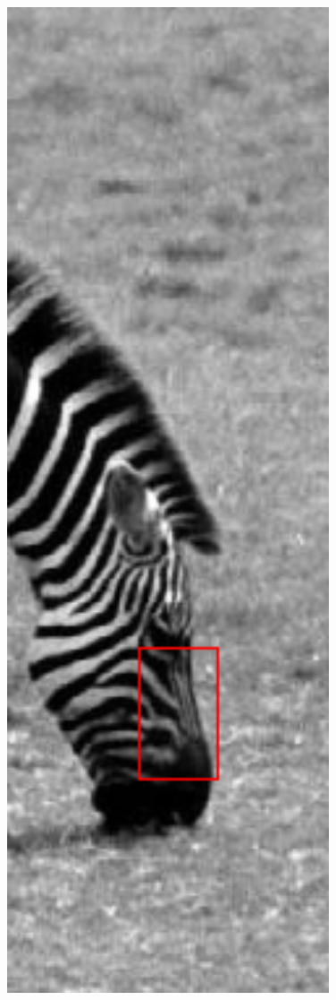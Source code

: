 \documentclass[review,numbers,sort&compress]{elsarticle}  %
\begin{document}
\begin{figure}[t]
{\begin{minipage}[b]{0.15\textwidth}
                \includegraphics[width=1\textwidth]{compareImage/zebra_crop_G_ORI.png} \\

\end{minipage}}
\end{figure}
\end{document}
